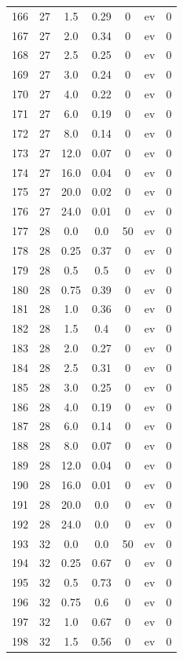 \documentclass[12pt,a4paper]{article}
\begin{document}
\begin{tabular}{r|cccccc}
	166 & 27 & 1.5 & 0.29 & 0 & ev & 0 \\
	167 & 27 & 2.0 & 0.34 & 0 & ev & 0 \\
	168 & 27 & 2.5 & 0.25 & 0 & ev & 0 \\
	169 & 27 & 3.0 & 0.24 & 0 & ev & 0 \\
	170 & 27 & 4.0 & 0.22 & 0 & ev & 0 \\
	171 & 27 & 6.0 & 0.19 & 0 & ev & 0 \\
	172 & 27 & 8.0 & 0.14 & 0 & ev & 0 \\
	173 & 27 & 12.0 & 0.07 & 0 & ev & 0 \\
	174 & 27 & 16.0 & 0.04 & 0 & ev & 0 \\
	175 & 27 & 20.0 & 0.02 & 0 & ev & 0 \\
	176 & 27 & 24.0 & 0.01 & 0 & ev & 0 \\
	177 & 28 & 0.0 & 0.0 & 50 & ev & 0 \\
	178 & 28 & 0.25 & 0.37 & 0 & ev & 0 \\
	179 & 28 & 0.5 & 0.5 & 0 & ev & 0 \\
	180 & 28 & 0.75 & 0.39 & 0 & ev & 0 \\
	181 & 28 & 1.0 & 0.36 & 0 & ev & 0 \\
	182 & 28 & 1.5 & 0.4 & 0 & ev & 0 \\
	183 & 28 & 2.0 & 0.27 & 0 & ev & 0 \\
	184 & 28 & 2.5 & 0.31 & 0 & ev & 0 \\
	185 & 28 & 3.0 & 0.25 & 0 & ev & 0 \\
	186 & 28 & 4.0 & 0.19 & 0 & ev & 0 \\
	187 & 28 & 6.0 & 0.14 & 0 & ev & 0 \\
	188 & 28 & 8.0 & 0.07 & 0 & ev & 0 \\
	189 & 28 & 12.0 & 0.04 & 0 & ev & 0 \\
	190 & 28 & 16.0 & 0.01 & 0 & ev & 0 \\
	191 & 28 & 20.0 & 0.0 & 0 & ev & 0 \\
	192 & 28 & 24.0 & 0.0 & 0 & ev & 0 \\
	193 & 32 & 0.0 & 0.0 & 50 & ev & 0 \\
	194 & 32 & 0.25 & 0.67 & 0 & ev & 0 \\
	195 & 32 & 0.5 & 0.73 & 0 & ev & 0 \\
	196 & 32 & 0.75 & 0.6 & 0 & ev & 0 \\
	197 & 32 & 1.0 & 0.67 & 0 & ev & 0 \\
	198 & 32 & 1.5 & 0.56 & 0 & ev & 0 \\

\end{tabular}
\end{document}
